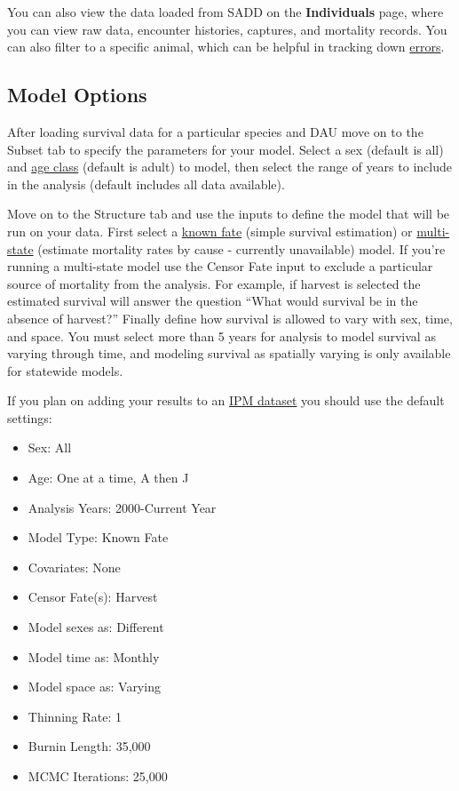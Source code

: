 \documentclass[
]{book}
\providecommand{\tightlist}{%
  \setlength{\itemsep}{0pt}\setlength{\parskip}{0pt}}
\begin{document}
You can also view the data loaded from SADD on the \textbf{Individuals} page, where you can view raw data, encounter histories, captures, and mortality records. You can also filter to a specific animal, which can be helpful in tracking down \protect\hyperlink{surv-errors}{errors}.

\hypertarget{surv-options}{%
\subsection{Model Options}\label{surv-options}}

After loading survival data for a particular species and DAU move on to the Subset tab to specify the parameters for your model. Select a sex (default is all) and \protect\hyperlink{gl-age-classes}{age class} (default is adult) to model, then select the range of years to include in the analysis (default includes all data available).

Move on to the Structure tab and use the inputs to define the model that will be run on your data. First select a \protect\hyperlink{gl-known-fate}{known fate} (simple survival estimation) or \protect\hyperlink{gl-multi-state}{multi-state} (estimate mortality rates by cause - currently unavailable) model. If you're running a multi-state model use the Censor Fate input to exclude a particular source of mortality from the analysis. For example, if harvest is selected the estimated survival will answer the question ``What would survival be in the absence of harvest?'' Finally define how survival is allowed to vary with sex, time, and space. You must select more than 5 years for analysis to model survival as varying through time, and modeling survival as spatially varying is only available for statewide models.

If you plan on adding your results to an \protect\hyperlink{gl-ipm-db}{IPM dataset} you should use the default settings:

\begin{itemize}
\tightlist
\item
  Sex: All
\item
  Age: One at a time, A then J
\item
  Analysis Years: 2000-Current Year
\item
  Model Type: Known Fate
\item
  Covariates: None
\item
  Censor Fate(s): Harvest
\item
  Model sexes as: Different
\item
  Model time as: Monthly
\item
  Model space as: Varying
\item
  Thinning Rate: 1
\item
  Burnin Length: 35,000
\item
  MCMC Iterations: 25,000
\end{itemize}
\end{document}
